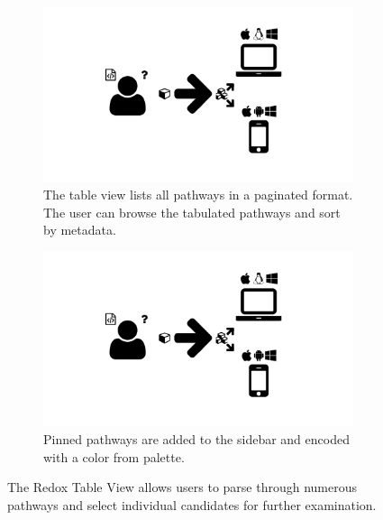 \begin{figure}
  \centering
  \begin{subfigure}[b]{\textwidth}
    \includegraphics[width=\textwidth, page=5,trim=0.37cm 3.65cm 13.1cm 3.3cm, clip=true]{images/Figures.pdf}
    \caption{The table view lists all pathways in a paginated format.
      The user can browse the tabulated pathways and sort by metadata.}
    \label{Figure:redox-table-view}
  \end{subfigure}
  \begin{subfigure}[b]{\textwidth}
    \includegraphics[width=\textwidth, page=5,trim=13.1cm 3.65cm 0.37cm 3.3cm, clip=true]{images/Figures.pdf}
    \caption{Pinned pathways are added to the sidebar and encoded with a color from palette.}
    \label{Figure:redox-table-pinned}
  \end{subfigure}
  \caption{The Redox Table View allows users to parse through numerous pathways and select individual candidates for further examination.}
  \label{Figure:redox-table}
\end{figure}


